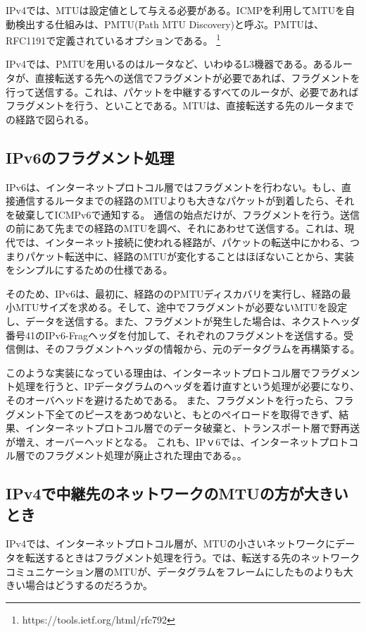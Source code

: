 IPv4では、MTUは設定値として与える必要がある。ICMPを利用してMTUを自動検出する仕組みは、PMTU(Path MTU Discovery)と呼ぶ。PMTUは、RFC1191で定義されているオプションである。
\footnote{https://tools.ietf.org/html/rfc792}

IPv4では、PMTUを用いるのはルータなど、いわゆるL3機器である。あるルータが、直接転送する先への送信でフラグメントが必要であれば、フラグメントを行って送信する。これは、パケットを中継するすべてのルータが、必要であればフラグメントを行う、といことである。MTUは、直接転送する先のルータまでの経路で図られる。

\subsection{IPv6のフラグメント処理}

IPv6は、インターネットプロトコル層ではフラグメントを行わない。もし、直接通信するルータまでの経路のMTUよりも大きなパケットが到着したら、それを破棄してICMPv6で通知する。
通信の始点だけが、フラグメントを行う。送信の前にあて先までの経路のMTUを調べ、それにあわせて送信する。これは、現代では、インターネット接続に使われる経路が、パケットの転送中にかわる、つまりパケット転送中に、経路のMTUが変化することはほぼないことから、実装をシンプルにするための仕様である。

そのため、IPv6は、最初に、経路ののPMTUディスカバリを実行し、経路の最小MTUサイズを求める。そして、途中でフラグメントが必要ないMTUを設定し、データを送信する。また、フラグメントが発生した場合は、ネクストヘッダ番号41のIPv6-Fragヘッダを付加して、それぞれのフラグメントを送信する。受信側は、そのフラグメントヘッダの情報から、元のデータグラムを再構築する。


このような実装になっている理由は、インターネットプロトコル層でフラグメント処理を行うと、IPデータグラムのヘッダを着け直すという処理が必要になり、そのオーバヘッドを避けるためである。
また、フラグメントを行ったら、フラグメント下全てのピースをあつめないと、もとのペイロードを取得できず、結果、インターネットプロトコル層でのデータ破棄と、トランスポート層で野再送が増え、オーバーヘッドとなる。
これも、IPｖ6では、インターネットプロトコル層でのフラグメント処理が廃止された理由である。。

\subsection{IPv4で中継先のネットワークのMTUの方が大きいとき}

IPv4では、インターネットプロトコル層が、MTUの小さいネットワークにデータを転送するときはフラグメント処理を行う。では、転送する先のネットワークコミュニケーション層のMTUが、データグラムをフレームにしたものよりも大きい場合はどうするのだろうか。

